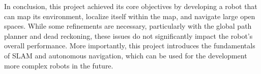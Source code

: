In conclusion, this project achieved its core objectives by developing a robot that can map its environment, localize itself within the map, and navigate large open spaces. While some refinements are necessary, particularly with the global path planner and dead reckoning, these issues do not significantly impact the robot's overall performance. More importantly, this project introduces the fundamentals of SLAM and autonomous navigation, which can be used for the development more complex robots in the future.